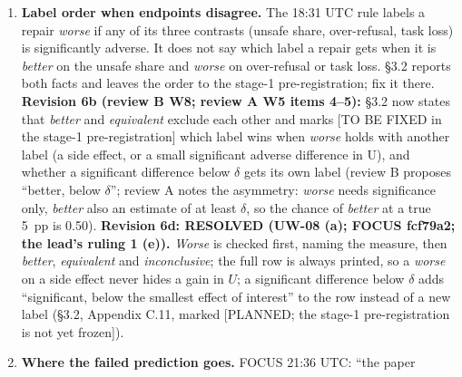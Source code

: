 \documentclass{article}
\theoremstyle{plain}
\theoremstyle{definition}
\theoremstyle{remark}
\begin{document}
\begin{enumerate}
        carries none of recipe G's reduction at one seed, so the arm's reason
        (that per-row weighting makes short rows matter more) has no support at
        the recipe level. The arm would still test it at the row level; keep it
        only if three seeds are cheap. \textbf{Revision 5:} with recipe B
        (per-row loss) the main recipe again, \S{}4.3 reverts to revision 2's
        ``the length rule under a token-mean loss''. Keep it only if three seeds
        are cheap, or drop it. \textbf{Revision 6b (review B W4, partly new):}
        review B asks to promote ``H1 and aR under token-mean loss'' to the
        primary family at six seeds, and to report tokens removed and the
        first-five-token loss share per removal arm. Not in the body; for the
        lead (risk 51).
  \item \textbf{Label order when endpoints disagree.} The 18:31 UTC rule labels
        a repair \emph{worse} if any of its three contrasts (unsafe share,
        over-refusal, task loss) is significantly adverse. It does not say which
        label a repair gets when it is \emph{better} on the unsafe share and
        \emph{worse} on over-refusal or task loss. \S{}3.2 reports both facts
        and leaves the order to the stage-1 pre-registration; fix it there.
        \textbf{Revision 6b (review B W8; review A W5 items 4--5):} \S{}3.2 now
        states that \emph{better} and \emph{equivalent} exclude each other and
        marks [TO BE FIXED in the stage-1 pre-registration] which label wins
        when \emph{worse} holds with another label (a side effect, or a small
        significant adverse difference in U), and whether a significant
        difference below $\delta$ gets its own label (review B proposes
        ``better, below $\delta$''; review A notes the asymmetry: \emph{worse}
        needs significance only, \emph{better} also an estimate of at least
        $\delta$, so the chance of \emph{better} at a true 5~pp is 0.50).
        \textbf{Revision 6d: RESOLVED (UW-08 (a); FOCUS fcf79a2; the lead's
        ruling 1 (e)).} \emph{Worse} is checked first, naming the measure, then
        \emph{better}, \emph{equivalent} and \emph{inconclusive}; the full row
        is always printed, so a \emph{worse} on a side effect never hides a gain
        in $U$; a significant difference below $\delta$ adds ``significant,
        below the smallest effect of interest'' to the row instead of a new
        label (\S{}3.2, Appendix C.11, marked [PLANNED; the stage-1
        pre-registration is not yet frozen]).
  \item \textbf{Where the failed prediction goes.} FOCUS 21:36 UTC: ``the paper

\end{enumerate}
\end{document}
